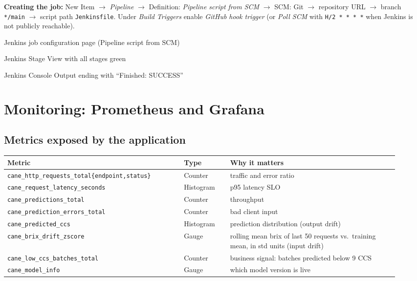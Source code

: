 \documentclass[10pt,a4paper]{article}
\let\oldsection\section
\renewcommand{\section}{\Needspace{14\baselineskip}\oldsection}
\begin{document}
\textbf{Creating the job:} New Item $\rightarrow$ \emph{Pipeline} $\rightarrow$ Definition: \emph{Pipeline script from SCM} $\rightarrow$ SCM: Git $\rightarrow$
repository URL $\rightarrow$ branch \texttt{*/main} $\rightarrow$ script path \texttt{Jenkinsfile}. Under \emph{Build Triggers} enable
\emph{GitHub hook trigger} (or \emph{Poll SCM} with \texttt{H/2 * * * *} when Jenkins is not publicly reachable).



\begin{shot}{Jenkins job configuration page (Pipeline script from SCM)}\end{shot}
\vspace{4pt}
\begin{shot}{Jenkins Stage View with all stages green}\end{shot}
\vspace{4pt}
\begin{shot}{Jenkins Console Output ending with ``Finished: SUCCESS''}\end{shot}

\section{Monitoring: Prometheus and Grafana}
\subsection*{Metrics exposed by the application}
\begin{center}
\small
\begin{tabular}{@{}p{0.42\linewidth}p{0.11\linewidth}p{0.40\linewidth}@{}}
\toprule
\textbf{Metric} & \textbf{Type} & \textbf{Why it matters}\\
\midrule
\texttt{cane\_http\_requests\_total\{endpoint,status\}} & Counter & traffic and error ratio\\
\texttt{cane\_request\_latency\_seconds} & Histogram & p95 latency SLO\\
\texttt{cane\_predictions\_total} & Counter & throughput\\
\texttt{cane\_prediction\_errors\_total} & Counter & bad client input\\
\texttt{cane\_predicted\_ccs} & Histogram & prediction distribution (output drift)\\
\texttt{cane\_brix\_drift\_zscore} & Gauge & rolling mean brix of last 50 requests vs.\ training mean, in std units (input drift)\\
\texttt{cane\_low\_ccs\_batches\_total} & Counter & business signal: batches predicted below 9 CCS\\
\texttt{cane\_model\_info} & Gauge & which model version is live\\
\bottomrule
\end{tabular}
\end{center}
\end{document}

